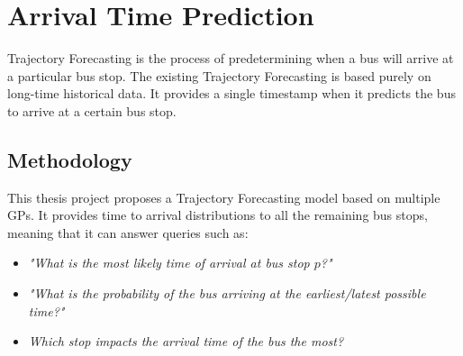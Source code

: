 \chapter{Arrival Time Prediction}
\label{cha:arrival-time-prediction}

Trajectory Forecasting is the process of predetermining when a bus will arrive at a particular bus stop.
The existing Trajectory Forecasting is based purely on long-time historical data.
It provides a single timestamp when it predicts the bus to arrive at a certain bus stop.


\section{Methodology}

This thesis project proposes a Trajectory Forecasting model based on multiple GPs.
It provides time to arrival distributions to all the remaining bus stops, meaning that it can answer queries such as:
\begin{itemize}
    \item \textit{"What is the most likely time of arrival at bus stop $p$?"}
    \item \textit{"What is the probability of the bus arriving at the earliest/latest possible time?"}
    \item \textit{Which stop impacts the arrival time of the bus the most?}
\end{itemize}

